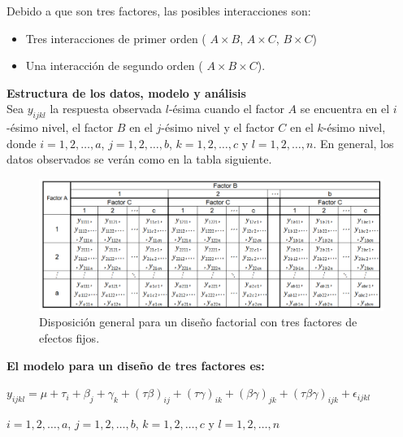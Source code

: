 Debido a que son tres factores, las posibles interacciones son:
\begin{itemize}
	\item Tres interacciones de primer orden ( $A \times B $,  $A \times C $,  $B \times C $)
	\item Una interacción de segundo orden ( $A \times B \times C $).
\end{itemize}

\textbf{Estructura de los datos, modelo y análisis}\\
Sea $y_{ijkl}$ la respuesta observada $l$-ésima cuando el factor $A$ se encuentra en el $i$-ésimo nivel, el factor $B$ en el $j$-ésimo nivel y el factor $C$ en el $k$-ésimo nivel, donde  $i = 1,2, \dots, a$, $j = 1,2, \dots, b$, $k = 1,2, \dots, c$  y $l = 1,2, \dots, n$. En general, los datos observados se verán como en la tabla siguiente.


\begin{figure}[H] 
	\centering 
	\includegraphics[width=0.90\linewidth]{img/factorial.png} 
	\caption{Disposición general para un diseño factorial con tres factores de efectos fijos.} 
	\label{fig:FactorialTres}
\end{figure}
\FloatBarrier

\textbf{El modelo para un diseño de tres factores es:}\\
	\begin{center}
	$y_{ijkl}=\mu + \tau_{i} + \beta_{j} + \gamma_{k} + (\tau \beta)_{ij} +(\tau \gamma)_{ik} + (\beta \gamma)_{jk} + (\tau \beta \gamma)_{ijk} + \epsilon_{ijkl} $

	$i = 1,2, \dots, a$, $j = 1,2, \dots, b$, $k = 1,2, \dots, c$  y $l = 1,2, \dots, n$
 \end{center}
 
